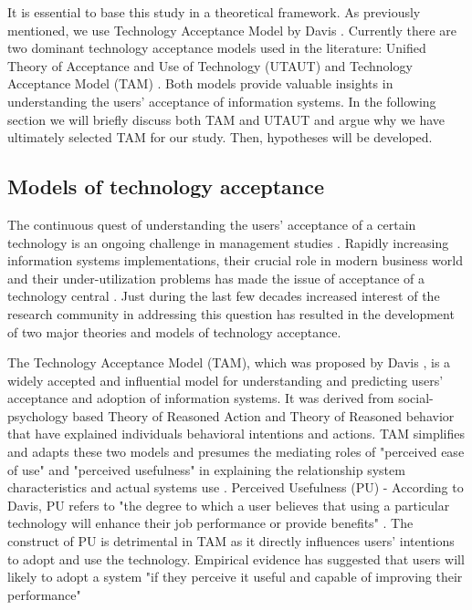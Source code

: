 \documentclass[a4paper,12pt]{article}
\newcommand{\citeyearonly}[1]{\citeyearpar{#1}}
\begin{document}
It is essential to base this study in a theoretical framework. As previously mentioned, we use Technology Acceptance Model by Davis \citeyearonly{davis1985technology}. Currently there are two dominant technology acceptance models used in the literature: Unified Theory of Acceptance and Use of Technology (UTAUT) and Technology Acceptance Model (TAM) \citep{venkatesh2003utaut, davis1985technology}. Both models provide valuable insights in understanding the users' acceptance of information systems. In the following section we will briefly discuss both TAM and UTAUT and argue why we have ultimately selected TAM for our study. Then, hypotheses will be developed.

\subsection{Models of technology acceptance}

The continuous quest of understanding the users' acceptance of a certain technology is an ongoing challenge in management studies \citep{schwarz2007looking, williams2009contemporary}.  Rapidly increasing information systems implementations, their crucial role in modern business world and their under-utilization problems has made the issue of acceptance of a technology central \citep{lancelotmiltgenDeterminantsEnduserAcceptance2013}. Just during the last few decades increased interest of the research community in addressing this question has resulted in the development of two major theories and models of technology acceptance. 

The Technology Acceptance Model (TAM), which was proposed by Davis \citeyearonly{davis1985technology}, is a widely accepted and influential model for understanding and predicting users' acceptance and adoption of information systems. It was derived from social-psychology based Theory of Reasoned Action and Theory of Reasoned behavior that have explained individuals behavioral intentions and actions. TAM simplifies and adapts these two models and presumes the mediating roles of "perceived ease of use" and "perceived usefulness" in explaining the relationship system characteristics and actual systems use \citep{marangunic2015technology}. 
Perceived Usefulness (PU) - According to Davis, PU refers to "the degree to which a user believes that using a particular technology will enhance their job performance or provide benefits" \citep{davis1985technology}. The construct of PU is detrimental in TAM as it directly influences users' intentions to adopt and use the technology. Empirical evidence has suggested that users will likely to adopt a system "if they perceive it useful and capable of improving their performance" \citep{davis1985technology}
\end{document}
